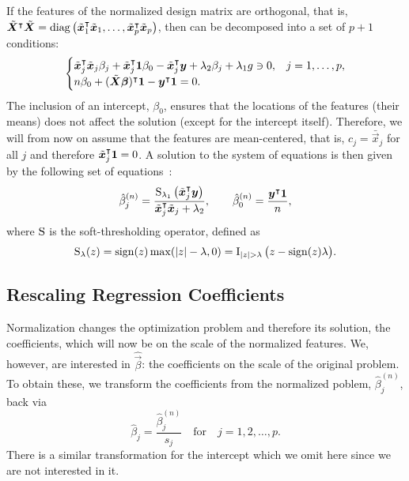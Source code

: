 If the features of the normalized design matrix are orthogonal, that is, \(\tilde{\boldsymbol{X}}^\intercal \tilde{\boldsymbol{X}} = \operatorname{diag}\left(\tilde{\boldsymbol{x}}_1^\intercal \tilde{\boldsymbol{x}}_1, \dots, \tilde{\boldsymbol{x}}_p^\intercal \tilde{\boldsymbol{x}}_p\right) \), then  can be decomposed into a set of \(p + 1\) conditions:
\[
  \begin{cases}
    \tilde{\boldsymbol{x}}_j^\intercal \tilde{\boldsymbol{x}}_j \beta_j + \tilde{\boldsymbol{x}}_j^\intercal \boldsymbol{1} \beta_0 - \tilde{\boldsymbol{x}}_j^\intercal\boldsymbol{y} + \lambda_2 \beta_j + \lambda_1 g \ni 0, & j=1,\dots,p, \\
    n \beta_0 + (\tilde{\boldsymbol{X}}\boldsymbol{\beta})^\intercal \boldsymbol{1} -  \boldsymbol{y}^\intercal \boldsymbol{1} = 0.
  \end{cases}
\]
The inclusion of an intercept, \(\beta_0\), ensures that the locations of the
features (their means) does not affect the solution (except for the intercept itself). Therefore,
we will from now on assume that the features are mean-centered, that is, \(c_j = \bar{\vec{x}}_j\) for all \(j\) and therefore \(\tilde{\boldsymbol{x}}_j^\intercal \boldsymbol{1} = 0\). A solution to the system of equations is then given by the following set of equations~\citep{donoho1994}:
\begin{equation*}
  \label{eq:orthogonal-solution-normalized}
  \hat{\beta}^{(n)}_j = \frac{\operatorname{S}_{\lambda_1}\left(\tilde{\boldsymbol{x}}_j^\intercal \boldsymbol{y}\right)}{\tilde{\boldsymbol{x}}_j^\intercal \tilde{\boldsymbol{x}}_j + \lambda_2},
  \qquad
  \hat{\beta}_0^{(n)} = \frac{\boldsymbol{y}^\intercal \boldsymbol{1}}{n},
\end{equation*}
where \(\operatorname{S}\) is the soft-thresholding operator, defined as
\[
  \st_\lambda(z) = \sign(z) \max(|z| - \lambda, 0) = \ind{|z|>\lambda}\big(z - \sign(z)\lambda\big).
\]

\subsection{Rescaling Regression Coefficients}

Normalization changes the optimization problem and therefore its solution, the coefficients, which will now be on the scale of the normalized features. We, however, are interested in \(\hat{\vec{\beta}}\): the coefficients on the scale of the original problem. To obtain these, we transform the coefficients from the normalized poblem, \(\hat\beta^{(n)}_j\), back via
\begin{equation}
  \label{eq:orthogonal-solution}
  \hat\beta_j = \frac{\hat\beta^{(n)}_j}{s_j} \quad\text{for}\quad j = 1,2,\dots,p.
\end{equation}
There is a similar transformation for the intercept which we omit here since we are not interested in it.

